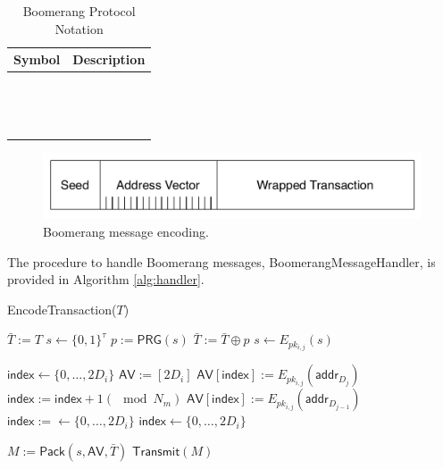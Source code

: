 \begin{table}[ht!]
\begin{center}
\caption{Boomerang Protocol Notation}
	\begin{tabular}{|l|l|}\hline
	\textbf{Symbol} & \textbf{Description} \\ \hline
	~ & ~ \\
	~ & ~ \\
	~ & ~ \\ \hline
	\end{tabular}
\end{center}
\end{table}

\begin{figure}[ht!]
\begin{center}
\includegraphics[scale=0.4]{./images/boomerang_message.pdf}
\caption{Boomerang message encoding.}
\label{fig:boomerang_message}
\end{center}
\end{figure}

The procedure to handle Boomerang messages, {\sf BoomerangMessageHandler}, is provided in Algorithm \ref{alg:handler}. 

\begin{algorithm*}[t!]
\caption{{\sf EncodeTransaction}($T$)}
\label{alg:encode}
\begin{algorithmic}[1]

	\State $\bar{T} := T$
	\State $s \gets \{0,1\}^{\tau}$
		\State $p := \mathsf{PRG}(s)$
		\State $\bar{T} := \bar{T} \oplus p$
		\State $s \gets E_{pk_{i,j}}(s)$
	\EndFor

	\State $\mathsf{index} \gets \{0,\dots,2D_i\}$ %
	\State $\mathsf{AV} := [2D_i]$ %
		\State $\mathsf{AV}[\mathsf{index}] := E_{pk_{i,j}}(\mathsf{addr}_{D_j})$
		\State $\mathsf{index} := \mathsf{index} + 1 (\mod N_m)$
		\State $\mathsf{AV}[\mathsf{index}] := E_{pk_{i,j}}(\mathsf{addr}_{D_{j-1}})$
		\State $\mathsf{index} := \gets \{0,\dots,2D_i\}$
			\State $\mathsf{index} \gets \{0,\dots,2D_i\}$
		\EndWhile
	\EndFor

	\State $M := \mathsf{Pack}(s, \mathsf{AV}, \bar{T})$
	\State $\mathsf{Transmit}(M)$
\EndFor

\end{algorithmic}
\end{algorithm*}

